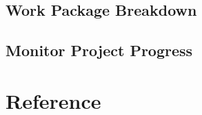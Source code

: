 \documentclass[11pt]{article}
\begin{document}
\subsection{Work Package Breakdown}

\subsection{Monitor Project Progress}

\section{Reference}
\end{document}
